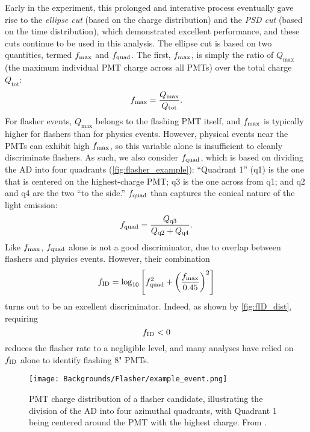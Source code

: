 \documentclass[../thesis.tex]{subfiles}
\begin{document}
Early in the experiment, this prolonged and interative process eventually gave rise to the \emph{ellipse cut} (based on the charge distribution) and the \emph{PSD cut} (based on the time distribution), which demonstrated excellent performance, and these cuts continue to be used in this analysis. The ellipse cut is based on two quantities, termed $f_{\mathrm{max}}$ and $f_{\mathrm{quad}}$. The first, $f_{\mathrm{max}}$, is simply the ratio of $Q_{\mathrm{max}}$ (the maximum individual PMT charge across all PMTs) over the total charge $Q_{\mathrm{tot}}$:
\begin{equation}
  f_{\mathrm{max}} = \frac{Q_{\mathrm{max}}}{Q_{\mathrm{tot}}}.
\end{equation}
For flasher events, $Q_{\mathrm{max}}$ belongs to the flashing PMT itself, and $f_{\mathrm{max}}$ is typically higher for flashers than for physics events. However, physical events near the PMTs can exhibit high $f_{\mathrm{max}}$, so this variable alone is insufficient to cleanly discriminate flashers. As such, we also consider $f_{\mathrm{quad}}$, which is based on dividing the AD into four quadrants (\autoref{fig:flasher_example}): ``Quadrant 1'' (q1) is the one that is centered on the highest-charge PMT; q3 is the one across from q1; and q2 and q4 are the two ``to the side.'' $f_{\mathrm{quad}}$ than captures the conical nature of the light emission:
\begin{equation}
  f_{\mathrm{quad}} = \frac{Q_{\mathrm{q3}}}{Q_{\mathrm{q2}} + Q_{\mathrm{q4}}}.
\end{equation}
Like $f_{\mathrm{max}}$, $f_{\mathrm{quad}}$ alone is not a good discriminator, due to overlap between flashers and physics events. However, their combination
\begin{equation}
  f_{\mathrm{ID}} = \log_{10} \left[ f_{\mathrm{quad}}^2 + \left( \frac{f_{\mathrm{max}}}{0.45} \right)^2 \right]
\end{equation}
turns out to be an excellent discriminator. Indeed, as shown by \autoref{fig:fID_dist}, requiring
\begin{equation}
  \label{eq:ellipseCut}
  f_{\mathrm{ID}} < 0
\end{equation}
reduces the flasher rate to a negligible level, and many analyses have relied on $f_{\mathrm{ID}}$ alone to identify flashing 8" PMTs.

\begin{figure}[h]
  \texttt{[image: Backgrounds/Flasher/example\_event.png]}
  \caption{PMT charge distribution of a flasher candidate, illustrating the division of the AD into four azimuthal quadrants, with Quadrant 1 being centered around the PMT with the highest charge. From \cite{An_2017}.}
  \label{fig:flasher_example}
\end{figure}
\end{document}
